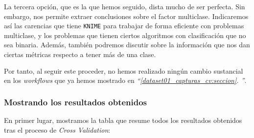 \documentclass[11pt]{article}
\newcommand{\customcite}[1]{\emph{``\ref{#1}. \nameref{#1}''}}
\begin{document}
La tercera opción, que es la que hemos seguido, dista mucho de ser perfecta. Sin embargo, nos permite extraer conclusiones sobre el factor multiclase. Indicaremos así las carencias que tiene \lstinline{KNIME} para trabajar de forma eficiente con problemas multiclase, y los problemas que tienen ciertos algoritmos con clasificación que no sea binaria. Además, también podremos discutir sobre la información que nos dan ciertas métricas respecto a tener más de una clase.

Por tanto, al seguir este proceder, no hemos realizado ningún cambio sustancial en los \emph{workflows} que ya hemos mostrado en \customcite{dataset01_capturas_cv:seccion}.

\pagebreak

\subsubsection{Mostrando los resultados obtenidos}

En primer lugar, mostramos la tabla que resume todos los resultados obtenidos tras el proceso de \emph{Cross Validation}:

\begin{table}[H]
\begin{center}
\end{center}
    \caption{Resultados de \emph{Cross Validation}, para los distintos algoritmos estudiados, en el segundo \emph{dataset}}
\end{table}
\end{document}
